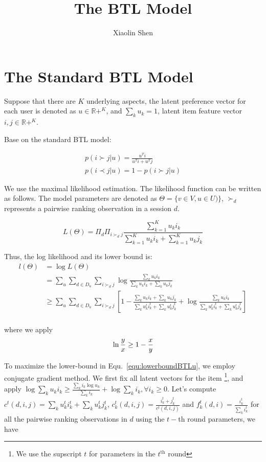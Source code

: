 \documentclass{article}
\title{The BTL Model}
\author{Xiaolin Shen}
\newcommand{\R}{\mathbb{R}}
\begin{document}
\maketitle


\section{The Standard BTL Model}
 Suppose that there are $K$ underlying aspects, the latent preference vector for each user is denoted as $u\in \R+^{K}$, and $\sum_k u_k=1$, latent item feature vector $i,j\in \R+^{K}$. 
 
 
Base on the standard BTL model:

\begin{align*}
	p(i \succ j |u)=\frac{u^Ti}{u^Ti+ u^Tj} \\
	p(i \prec j |u)=1-p(i \succ j |u)
\end{align*}

We use the maximal likelihood estimation. The likelihood function can be written as follows. The model parameters are denoted as $ \Theta = \{ v \in V ,u \in U ) \}$, $\succ_d$ represents a pairwise ranking observation in a session $d$.

\begin{equation}
L(\Theta)=\Pi_{d} \Pi_{i\succ_d j } \frac{\sum_{k=1}^{K} u_k i_k}{\sum_{k=1}^{K} u_k i_k+ \sum_{k=1}^{K} u_k j_k}
\end{equation}

Thus, the log likelihood and its lower bound  is:
\begin{align}
l(\Theta) &= \log L(\Theta) \\ \nonumber
& =\sum_u \sum_{d \in D_u} \sum_{i\succ_d j }  \log \frac{\sum_k u_k i_k}{\sum_k u_k i_k+ \sum_k u_k j_k}\\ \nonumber
& \geq \sum_u \sum_{d \in D_u} \sum_{i\succ_d j } [1- \frac{\sum_k u_k i_k+ \sum_k u_k j_k}{\sum_k u_k^t i_k^t + \sum_k u_k^t j_k^t} + \log \frac{\sum_k u_k i_k}{\sum_k u_k^t i_k^t + \sum_k u_k^t j_k^t}]\\
\end{align}\label{equ:lowerboundBTLu}

where we apply 
\begin{equation*}
\ln \frac{y}{x} \geq 1- \frac{x}{y}\\
\end{equation*}

To maximize the lower-bound in Equ.~\ref{equ:lowerboundBTLu}, we employ conjugate gradient method. We first fix all latent vectors for the item \footnote{We use the supscript  $t$ for parameters in the $t^{\textrm{th}}$ round}, and apply $ \log \sum_k u_k i_k \geq \frac{\sum_k i_k \log u_k}{\sum_k i_k} + \log \sum_k i_k, \forall i_k\geq 0$. Let's compute $c^t(d,i,j)=\sum_k u_k^t i_k^t + \sum_k u_k^t j_k^t$, $c_k^t(d,i,j)=\frac{i_k^t + j_k^t}{c^t(d,i,j)}$ and $f_k^t(d,i)=\frac{i_k^t}{\sum_k i_k^t}$ for all the pairwise ranking observations in $d$ using the $t-$th round parameters, we have%
\end{document}
